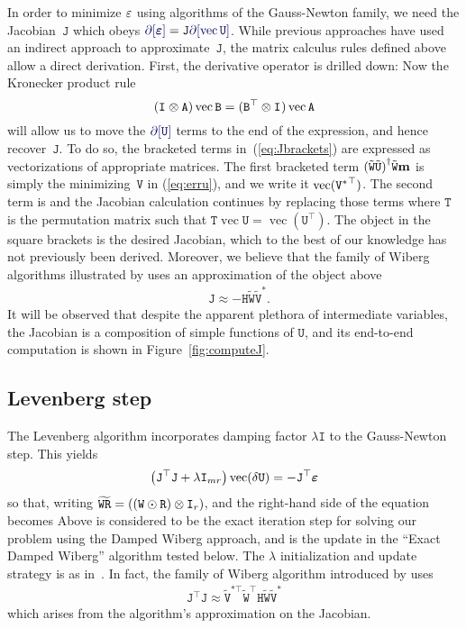 \documentclass[runningheads]{llncs}
\def\eqref#1{(\ref{eq:#1})}
\def\eqlabel#1{\label{eq:#1}}
\def\tr{^\top}
\def\vec{\operatorname{vec}}
\def\hadamard{\odot}
\def\m#1{\ensuremath{\mathtt{#1}}}
\def\v#1{\ensuremath{\mathbf{#1}}}
\def\mU{\m U}
\def\mV{\m V}
\def\mW{\m W}
\def\twiddle#1{{\tilde{#1}}}
\def\tU{\twiddle\mU}
\def\tW{\twiddle\mW}
\def\tV{\twiddle\mV}
\def\tVstar{{\twiddle\mV}^*}
\begin{document}
In order to minimize $\varepsilon$ using algorithms of the Gauss-Newton family, we need the Jacobian~$\m J$ which obeys $\diff[\verru] = \m J \diff[\vec\mU]$.  While previous approaches have used an indirect approach to approximate~\m J, the matrix calculus rules defined above allow a direct derivation.  First, the derivative operator is drilled down:
\def\awfhl#1{\Bigl[#1\Bigr]}
\dEpsOnePartOne
Now the Kronecker product rule
\begin{equation}
(\kron{\Id{}}{\m A}) \vec \m B = (\kron{\m B \tr}{\Id{}}) \vec{\m A}
\eqlabel{kronvec}
\end{equation}
will allow us to move the $\diff[\mU]$ terms to the end of the expression, and hence recover~$\m J$.   To do so, the bracketed terms in~\eqref{Jbrackets} are expressed as vectorizations of appropriate matrices.
The first bracketed term $\pinv{(\tW\tU)} \tW \v m$ is simply the minimizing~$\mV$ in \eqref{erru}, and we write it $\vec(\Vstar\tr)$. The second term is
\toVecDot
and the Jacobian calculation continues by replacing those terms
\def\Ttrans{\m{T}}
\dEpsOne
where $\Ttrans$ is the permutation matrix such that $\Ttrans\vec\mU = \vec(\mU\tr)$.   The object in the square brackets is the desired Jacobian, which to the best of our knowledge has not previously been derived. Moreover, we believe that the family of Wiberg algorithms illustrated by \cite{okatani2006wiberg} uses an approximation of the object above
\begin{align}
&\m J \approx - \m H \tW \tVstar.
\end{align}
It will be observed that despite the apparent plethora of intermediate variables, the Jacobian is a composition of simple functions of $\m U$, and its end-to-end computation is shown in Figure~\ref{fig:computeJ}.

\subsection{Levenberg step}
\def\tVstar_tr{{\tV^*}^\top}
The Levenberg algorithm incorporates damping factor $\lambda \m I$ to the Gauss-Newton step. This yields
\begin{align}
\left( \m J \tr \m J + \lambda \m I_{mr} \right) \vec(\delta \m U) = - \m J \tr \verru
\eqlabel{levenberg}
\end{align}
\def\WRT{\widetilde{\mathtt{WR}}}
so that, writing $\WRT= (\kron{(\mW\hadamard\m R)}{\Id r})$,
\JOneJOne
and the right-hand side of the equation becomes
\JOneEpsOne
Above is considered to be the exact iteration step for solving our problem using the Damped Wiberg approach, and is the update in the ``Exact Damped Wiberg'' algorithm tested below.   The $\lambda$ initialization and update strategy is as in~\cite{okatani2006wiberg}.  In fact, the family of Wiberg algorithm introduced by \cite{okatani2006wiberg} uses 
\begin{align}
\m J \tr \m J \approx \tilde{\m V}^{*\top} \tW \tr \m H \tW \tV^*
\end{align}
which arises from the algorithm's approximation on the Jacobian.
\end{document}
